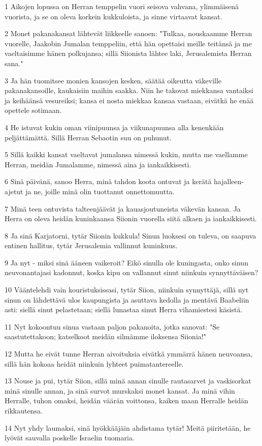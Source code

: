 \par 1 Aikojen lopussa on Herran temppelin vuori seisova vahvana, ylimmäisenä vuorista, ja se on oleva korkein kukkuloista, ja sinne virtaavat kansat.
\par 2 Monet pakanakansat lähtevät liikkeelle sanoen: "Tulkaa, nouskaamme Herran vuorelle, Jaakobin Jumalan temppeliin, että hän opettaisi meille teitänsä ja me vaeltaisimme hänen polkujansa; sillä Siionista lähtee laki, Jerusalemista Herran sana."
\par 3 Ja hän tuomitsee monien kansojen kesken, säätää oikeutta väkeville pakanakansoille, kaukaisiin maihin saakka. Niin he takovat miekkansa vantaiksi ja keihäänsä vesureiksi; kansa ei nosta miekkaa kansaa vastaan, eivätkä he enää opettele sotimaan.
\par 4 He istuvat kukin oman viinipuunsa ja viikunapuunsa alla kenenkään peljättämättä. Sillä Herran Sebaotin suu on puhunut.
\par 5 Sillä kaikki kansat vaeltavat jumalansa nimessä kukin, mutta me vaellamme Herran, meidän Jumalamme, nimessä aina ja iankaikkisesti.
\par 6 Sinä päivänä, sanoo Herra, minä tahdon koota ontuvat ja kerätä hajalleen-ajetut ja ne, joille minä olin tuottanut onnettomuutta.
\par 7 Minä teen ontuvista talteenjäävät ja kauasjoutuneista väkevän kansan. Ja Herra on oleva heidän kuninkaansa Siionin vuorella siitä alkaen ja iankaikkisesti.
\par 8 Ja sinä Karjatorni, tytär Siionin kukkula! Sinun luoksesi on tuleva, on saapuva entinen hallitus, tytär Jerusalemia vallinnut kuninkuus.
\par 9 Ja nyt - miksi sinä ääneen vaikeroit? Eikö sinulla ole kuningasta, onko sinun neuvonantajasi kadonnut, koska kipu on vallannut sinut niinkuin synnyttäväisen?
\par 10 Vääntelehdi vain kouristuksissasi, tytär Siion, niinkuin synnyttäjä, sillä nyt sinun on lähdettävä ulos kaupungista ja asuttava kedolla ja mentävä Baabeliin asti: siellä sinut pelastetaan; siellä lunastaa sinut Herra vihamiestesi käsistä.
\par 11 Nyt kokoontuu sinua vastaan paljon pakanoita, jotka sanovat: "Se saastutettakoon; katselkoot meidän silmämme iloksensa Siionia!"
\par 12 Mutta he eivät tunne Herran aivoituksia eivätkä ymmärrä hänen neuvoansa, sillä hän kokoaa heidät niinkuin lyhteet puimatantereelle.
\par 13 Nouse ja pui, tytär Siion, sillä minä annan sinulle rautasarvet ja vaskisorkat minä sinulle annan, ja sinä survot murskaksi monet kansat. Ja minä vihin Herralle, tuhon omaksi, heidän väärän voittonsa, kaiken maan Herralle heidän rikkautensa.
\par 14 Nyt yhdy laumaksi, sinä hyökkääjäin ahdistama tytär! Meitä piiritetään, he lyövät sauvalla poskelle Israelin tuomaria.

